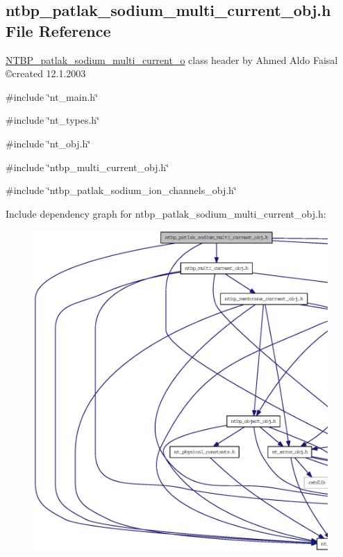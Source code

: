 \subsection{ntbp\_\-patlak\_\-sodium\_\-multi\_\-current\_\-obj.h File Reference}
\label{ntbp__patlak__sodium__multi__current__obj_8h}



\begin{DoxyItemize}
\item \hyperlink{class_n_t_b_p__patlak__sodium__multi__current__o}{NTBP\_\-patlak\_\-sodium\_\-multi\_\-current\_\-o} class header by Ahmed Aldo Faisal \copyright created 12.1.2003 
\end{DoxyItemize} 


{\ttfamily \#include \char`\"{}nt\_\-main.h\char`\"{}}\par
{\ttfamily \#include \char`\"{}nt\_\-types.h\char`\"{}}\par
{\ttfamily \#include \char`\"{}nt\_\-obj.h\char`\"{}}\par
{\ttfamily \#include \char`\"{}ntbp\_\-multi\_\-current\_\-obj.h\char`\"{}}\par
{\ttfamily \#include \char`\"{}ntbp\_\-patlak\_\-sodium\_\-ion\_\-channels\_\-obj.h\char`\"{}}\par
Include dependency graph for ntbp\_\-patlak\_\-sodium\_\-multi\_\-current\_\-obj.h:
\nopagebreak
\begin{figure}[H]
\begin{center}
\leavevmode
\includegraphics[width=400pt]{ntbp__patlak__sodium__multi__current__obj_8h__incl}
\end{center}
\end{figure}
